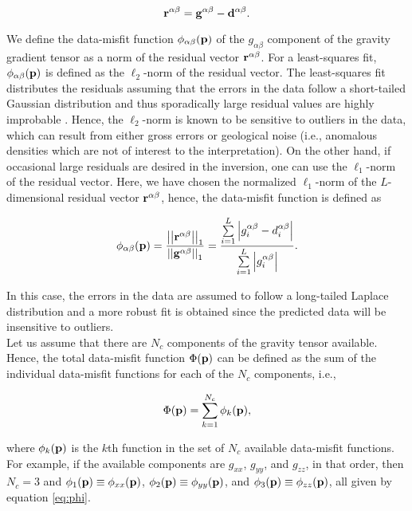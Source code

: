 \begin{equation}
    \mathbf{r}^{\alpha\beta} = \mathbf{g}^{\alpha\beta} - \mathbf{d}^{\alpha\beta}.
    \label{eq:residual}
\end{equation}

\noindent We define the data-misfit function $\phi_{\alpha\beta}(\mathbf{p})$
of the $g_{\alpha\beta}$ component of the gravity gradient tensor as a norm of
the residual vector $\mathbf{r}^{\alpha\beta}$. For a least-squares fit,
$\phi_{\alpha\beta}(\mathbf{p})$ is defined as the
$\ell_2$-norm of the residual vector.
The least-squares fit distributes the residuals assuming that the errors in the
data follow a short-tailed Gaussian distribution and thus sporadically large
residual values are highly improbable \citep{claerbout, silva_holmann, menke,
tarantola}.
Hence, the $\ell_2$-norm is known to be sensitive to outliers in the data, which
can result from either gross errors or geological noise (i.e., anomalous
densities which are not of interest to the interpretation).
On the other hand, if occasional large residuals are desired in the inversion,
one can use the $\ell_1$-norm of the residual vector.
Here, we have chosen the normalized $\ell_1$-norm of the $L$-dimensional
residual vector $\mathbf{r}^{\alpha\beta}$, hence,
the data-misfit function is defined as

\begin{equation}
\phi_{\alpha\beta}(\mathbf{p}) =
\frac{\left|\left|\mathbf{r}^{\alpha\beta}\right|\right|_1}{\left|\left|\mathbf{g}^{\alpha\beta}\right|\right|_1} =
\frac{\sum\limits_{i=1}^{L}\left|g_i^{\alpha\beta} - d_i^{\alpha\beta}\right|}
     {\sum\limits_{i=1}^{L}\left|g_i^{\alpha\beta}\right|}.
\label{eq:phi}
\end{equation}

\noindent
In this case, the errors in the data are assumed to follow a long-tailed
Laplace distribution and a more robust fit is obtained since the predicted data
will be insensitive to outliers.
\\ \indent
Let us assume that there are $N_c$ components of the gravity tensor
available.
Hence, the total data-misfit function $\Phi(\mathbf{p})$ can be defined as the
sum of the individual data-misfit functions for each of the $N_c$ components,
i.e.,

\begin{equation}
\Phi(\mathbf{p}) = \sum\limits_{k=1}^{N_c}\phi_k(\mathbf{p}),
\label{eq:Phi}
\end{equation}

\noindent
where $\phi_k(\mathbf{p})$ is the $k$th function in the set of
$N_c$ available data-misfit functions. For example, if the available components
are $g_{xx}$, $g_{yy}$, and $g_{zz}$, in that order, then $N_c = 3$ and
$\phi_1(\mathbf{p}) \equiv \phi_{xx}(\mathbf{p})$, 
$\phi_2(\mathbf{p}) \equiv \phi_{yy}(\mathbf{p})$, and
$\phi_3(\mathbf{p}) \equiv \phi_{zz}(\mathbf{p})$, all given by equation
\ref{eq:phi}.

